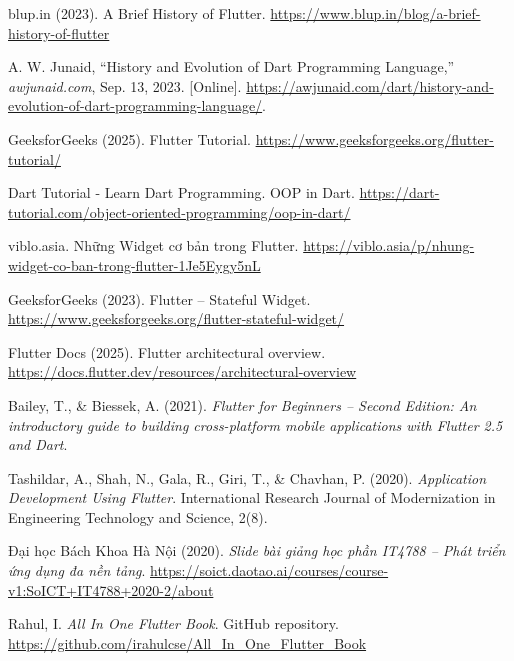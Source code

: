 \hypersetup{
  colorlinks=true,
  urlcolor=blue,
  linkcolor=black,
  citecolor=black
}

\begin{enumerate}[leftmargin=*, label={[\arabic*]}]
  \item blup.in (2023). A Brief History of Flutter.           \url{https://www.blup.in/blog/a-brief-history-of-flutter}
  \item A. W. Junaid, “History and Evolution of Dart Programming Language,” \textit{awjunaid.com}, Sep. 13, 2023. [Online]. \url{https://awjunaid.com/dart/history-and-evolution-of-dart-programming-language/}.
  \item GeeksforGeeks (2025). Flutter Tutorial. \url{https://www.geeksforgeeks.org/flutter-tutorial/}
  \item Dart Tutorial - Learn Dart Programming. OOP in Dart. \url{https://dart-tutorial.com/object-oriented-programming/oop-in-dart/}
  \item viblo.asia. Những Widget cơ bản trong Flutter. \url{https://viblo.asia/p/nhung-widget-co-ban-trong-flutter-1Je5Eygy5nL}
  \item GeeksforGeeks (2023). Flutter – Stateful Widget. \url{https://www.geeksforgeeks.org/flutter-stateful-widget/}
  \item Flutter Docs (2025). Flutter architectural overview. \url{https://docs.flutter.dev/resources/architectural-overview}
  \item Bailey, T., \& Biessek, A. (2021). \textit{Flutter for Beginners – Second Edition: An introductory guide to building cross-platform mobile applications with Flutter 2.5 and Dart}.
  \item Tashildar, A., Shah, N., Gala, R., Giri, T., \& Chavhan, P. (2020). \textit{Application Development Using Flutter}. International Research Journal of Modernization in Engineering Technology and Science, 2(8). 
  \item Đại học Bách Khoa Hà Nội (2020). \textit{Slide bài giảng học phần IT4788 – Phát triển ứng dụng đa nền tảng}. \url{https://soict.daotao.ai/courses/course-v1:SoICT+IT4788+2020-2/about} 
  \item Rahul, I. \textit{All In One Flutter Book}. GitHub repository. \url{https://github.com/irahulcse/All_In_One_Flutter_Book}
\end{enumerate}
